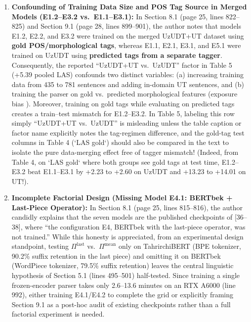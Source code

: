 \documentclass[11pt,a4paper]{article}
\begin{document}
\begin{enumerate}[label=\textbf{Issue \arabic*:}, resume, wide, labelwidth=!, labelindent=0pt]
    \item \textbf{Confounding of Training Data Size and POS Tag Source in Merged Models (E1.2--E3.2 vs.\ E1.1--E3.1):}
    In Section 8.1 (page 25, lines 822--825) and Section 9.1 (page 28, lines 899--901), the author notes that models E1.2, E2.2, and E3.2 were trained on the merged UzUDT+UT dataset using \textbf{gold POS/morphological tags}, whereas E1.1, E2.1, E3.1, and E5.1 were trained on UzUDT using \textbf{predicted tags from a separate tagger}. Consequently, the reported ``UzUDT+UT vs.\ UzUDT'' factor in Table 5 (+5.39 pooled LAS) confounds two distinct variables: (a) increasing training data from 435 to 781 sentences and adding in-domain UT sentences, and (b) training the parser on gold vs.\ predicted morphological features (exposure bias \cite{Ballesteros2015}). Moreover, training on gold tags while evaluating on predicted tags creates a train--test mismatch for E1.2--E3.2. In Table 5, labeling this row simply ``UzUDT+UT vs.\ UzUDT'' is misleading unless the table caption or factor name explicitly notes the tag-regimen difference, and the gold-tag test columns in Table 4 (`LAS gold`) should also be compared in the text to isolate the pure data-merging effect free of tagger mismatch! (Indeed, from Table 4, on `LAS gold` where both groups see gold tags at test time, E1.2--E3.2 beat E1.1--E3.1 by +2.23 to +2.60 on UzUDT and +13.23 to +14.01 on UT!).

    \item \textbf{Incomplete Factorial Design (Missing Model E4.1: BERTbek + Last-Piece Operator):}
    In Section 8.1 (page 25, lines 815--816), the author candidly explains that the seven models are the published checkpoints of [36--38], where ``the configuration E4, BERTbek with the last-piece operator, was not trained.'' While this honesty is appreciated, from an experimental design standpoint, testing $\Pi^{\mathrm{last}}$ vs.\ $\Pi^{\mathrm{mean}}$ only on TahrirchiBERT (BPE tokenizer, 90.2\% suffix retention in the last piece) and omitting it on BERTbek (WordPiece tokenizer, 79.5\% suffix retention) leaves the central linguistic hypothesis of Section 5.1 (lines 495--501) half-tested. Since training a single frozen-encoder parser takes only 2.6--13.6 minutes on an RTX A6000 (line 992), either training E4.1/E4.2 to complete the grid or explicitly framing Section 9.1 as a post-hoc audit of existing checkpoints rather than a full factorial experiment is needed.


\end{enumerate}
\end{document}

